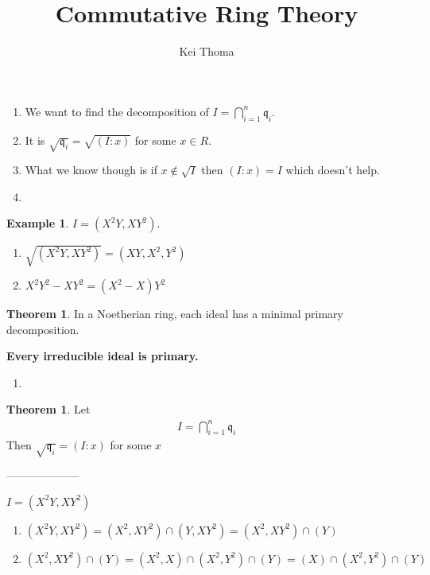 \documentclass[a4paper]{book}
\title{Commutative Ring Theory}
\author{Kei Thoma}
\theoremstyle{definition}
\newtheorem{example}{Example}[definition]
\newtheorem{theorem}[definition]{Theorem}
\begin{document}
\begin{enumerate}
    \item We want to find the decomposition of \(I = \bigcap_{i=1}^n \mathfrak{q}_i\).
    \item It is \(\sqrt{\mathfrak{q}_i} = \sqrt{(I : x)}\) for some \(x \in R\).
    \item What we know though is if \(x \not\in \sqrt{I}\) then \((I : x) = I\) which doesn't help.
    \item
\end{enumerate}

\begin{example}
    \(I = (X^2Y, XY^2)\).
    \begin{enumerate}
        \item \(\sqrt{(X^2Y, XY^2)} = (XY, X^2, Y^2)\)
        \item \(X^2 Y^2 - XY^2 = (X^2 - X) Y^2\)
    \end{enumerate}
\end{example}


\begin{thmbox}
    \begin{theorem}
        In a Noetherian ring, each ideal has a minimal primary decomposition.
    \end{theorem}
\end{thmbox}

\noindent\textbf{Every irreducible ideal is primary.}

\begin{enumerate}
    \item 
\end{enumerate}

\begin{thmbox}
    \begin{theorem}
        Let
        \begin{align*}
            I = \bigcap_{i=1}^n \mathfrak{q}_i
        \end{align*}
        Then \(\sqrt{\mathfrak{q}_i} = (I : x)\) for some \(x\)
    \end{theorem}
\end{thmbox}


--------------------

\(I = (X^2Y, XY^2)\)

\begin{enumerate}
    \item \((X^2Y, XY^2) = (X^2, XY^2) \cap (Y, XY^2) = (X^2, XY^2) \cap (Y)\)
    \item \((X^2, XY^2) \cap (Y) = (X^2, X) \cap (X^2, Y^2) \cap (Y) = (X) \cap (X^2, Y^2) \cap (Y)\)
\end{enumerate}
\end{document}
